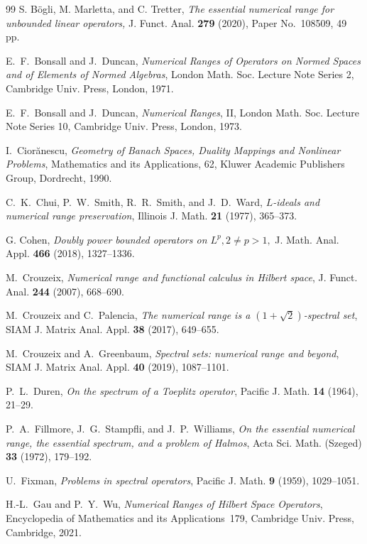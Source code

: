\documentclass[11pt]{amsart}
\numberwithin{equation}{section}
\theoremstyle{definition}
\theoremstyle{remark}
\begin{document}
\begin{thebibliography}{99}
 S. B\" ogli, M. Marletta, and C. Tretter, \emph{The essential numerical range for unbounded linear operators,} J. Funct. Anal. \textbf{279} (2020), Paper No.~108509, 49 pp.


E.~F.~Bonsall and J.~Duncan,
\emph{Numerical Ranges of Operators on Normed Spaces and of Elements of Normed Algebras},
London Math. Soc. Lecture Note Series 2, Cambridge Univ. Press, London, 1971.

E.~F.~Bonsall and J.~Duncan,
\emph{Numerical Ranges}, II,
London Math. Soc. Lecture Note Series 10, Cambridge Univ. Press, London, 1973.



I.~Cior\u{a}nescu,
\emph{Geometry of Banach Spaces, Duality Mappings and Nonlinear Problems},
Mathematics and its Applications, 62, Kluwer Academic Publishers Group, Dordrecht, 1990.

C.~K.~Chui, P.~W.~Smith, R.~R.~Smith, and J.~D.~Ward,
\emph{$L$-ideals and numerical range preservation},
Illinois J. Math. \textbf{21} (1977), 365--373.


G. Cohen, \emph{Doubly power bounded operators on $L^p, 2 \neq p>1,$}
 J. Math. Anal. Appl. \textbf{466} (2018), 1327--1336.
 
 
M.~Crouzeix,
\emph{Numerical range and functional calculus in Hilbert space},
J. Funct. Anal. \textbf{244} (2007),  668--690.

M.~Crouzeix and C.~Palencia,
\emph{The numerical range is a $(1+\sqrt2)$-spectral set},
SIAM J. Matrix Anal. Appl. \textbf{38} (2017),  649--655.


M.~Crouzeix and A.~Greenbaum,
\emph{Spectral sets: numerical range and beyond},
SIAM J. Matrix Anal. Appl. \textbf{40} (2019), 1087--1101.



P.~L.~Duren,
\emph{On the spectrum of a Toeplitz operator},
Pacific J. Math. \textbf{14} (1964), 21--29.


P.~A.~Fillmore, J.~G.~Stampfli, and J.~P.~Williams,
\emph{On the essential numerical range, the essential spectrum, and a problem of Halmos},
Acta Sci. Math. (Szeged) \textbf{33} (1972), 179--192.


U.~Fixman,
\emph{Problems in spectral operators},
Pacific J. Math. \textbf{9} (1959), 1029--1051.


H.-L.~Gau and P.~Y.~Wu,
\emph{Numerical Ranges of Hilbert Space Operators},
Encyclopedia of Mathematics and its Applications~179, Cambridge Univ. Press, Cambridge, 2021.



\end{thebibliography}
\end{document}
